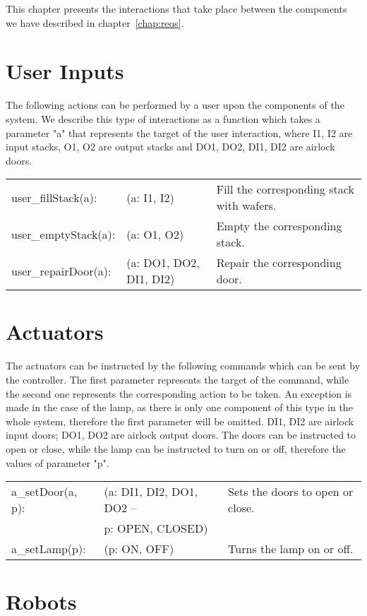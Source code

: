
This chapter presents the interactions that take place between the components we have described in chapter~\ref{chap:reqs}.

\section{User Inputs}

The following actions can be performed by a user upon the components of the system. We describe this type of interactions as a function which takes a parameter "a" that represents the target of the user interaction, where I1, I2 are input stacks, O1, O2 are output stacks and DO1, DO2, DI1, DI2 are airlock doors.

\begin{tabular}{ l l l }
  user_fillStack(a): & (a: I1, I2) & Fill the corresponding stack with wafers. \\
  user_emptyStack(a): & (a: O1, O2) & Empty the corresponding stack. \\
  user_repairDoor(a): & (a: DO1, DO2, DI1, DI2) & Repair the corresponding door. \\
\end{tabular}

\section{Actuators}

The actuators can be instructed by the following commands which can be sent by the controller. The first parameter represents the target of the command, while the second one represents the corresponding action to be taken. An exception is made in the case of the lamp, as there is only one component of this type in the whole system, therefore the first parameter will be omitted. DI1, DI2 are airlock input doors; DO1, DO2 are airlock output doors.
The doors can be instructed to open or close, while the lamp can be instructed to turn on or off, therefore the values of parameter "p".

\begin{tabular}{ l l l }
  a_setDoor(a, p): & (a: DI1, DI2, DO1, DO2 --  & Sets the doors to open or close. \\
  &  p: OPEN, CLOSED) & \\
  a_setLamp(p): & (p: ON, OFF) & Turns the lamp on or off. \\
\end{tabular}

\section{Robots}

